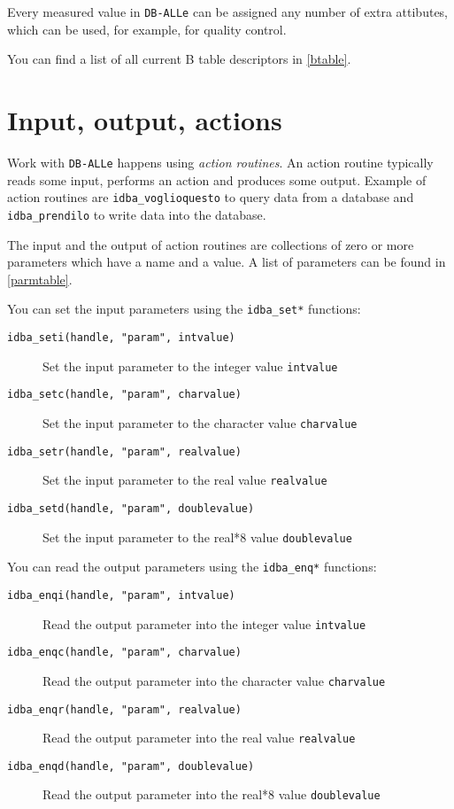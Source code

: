 \documentclass[draft,12pt,a4paper,twoside]{book}
\newcommand{\dballe}{{\tt DB-ALLe}}
\begin{document}
Every measured value in \dballe{} can be assigned any number of extra
attibutes, which can be used, for example, for quality control.

You can find a list of all current B table descriptors in \ref{btable}.

\section {Input, output, actions}
\label{basics-inout}

Work with \dballe{} happens using \emph{action routines}.  An action routine
typically reads some input, performs an action and produces some output.
Example of action routines are {\tt idba\_voglioquesto} to query data from a
database and {\tt idba\_prendilo} to write data into the database.

The input and the output of action routines are collections of zero or more
parameters which have a name and a value.  A list of parameters can be found in
\ref{parmtable}.

You can set the input parameters using the {\tt idba\_set*} functions:
\label{fun-idba_set}

\begin{description}
\item[{\tt idba\_seti(handle, "param", intvalue)}]
  Set the input parameter to the integer value {\tt intvalue}

\item[{\tt idba\_setc(handle, "param", charvalue)}]
  Set the input parameter to the character value {\tt charvalue}

\item[{\tt idba\_setr(handle, "param", realvalue)}]
  Set the input parameter to the real value {\tt realvalue}

\item[{\tt idba\_setd(handle, "param", doublevalue)}]
  Set the input parameter to the real*8 value {\tt doublevalue}
\end{description}

You can read the output parameters using the {\tt idba\_enq*} functions:
\label{fun-idba_enq}

\begin{description}
\item[{\tt idba\_enqi(handle, "param", intvalue)}]
  Read the output parameter into the integer value {\tt intvalue}

\item[{\tt idba\_enqc(handle, "param", charvalue)}]
  Read the output parameter into the character value {\tt charvalue}

\item[{\tt idba\_enqr(handle, "param", realvalue)}]
  Read the output parameter into the real value {\tt realvalue}

\item[{\tt idba\_enqd(handle, "param", doublevalue)}]
  Read the output parameter into the real*8 value {\tt doublevalue}
\end{description}
\end{document}
